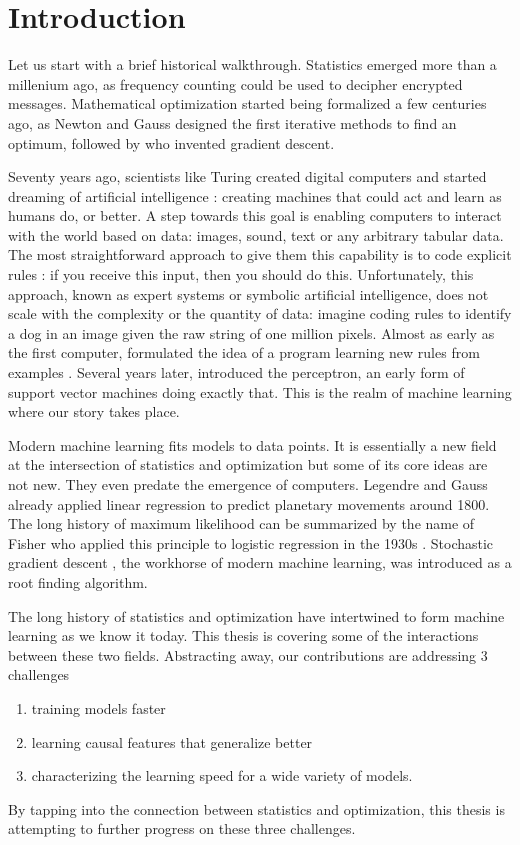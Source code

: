\setcounter{theorem}{0}

\chapter{Introduction}

Let us start with a brief historical walkthrough.
Statistics emerged more than a millenium ago, as frequency counting could be used to decipher encrypted messages.
Mathematical optimization started being formalized a few centuries ago, as
Newton and Gauss designed the first iterative methods to find an optimum, followed by \citet{cauchy1847methode}  who invented gradient descent.

Seventy years ago, scientists like Turing created  digital computers and started dreaming of artificial intelligence : creating machines that could act and learn as humans do, or better.
A step towards this goal is enabling computers to interact with the world based on data: images, sound, text or any arbitrary tabular data.
The most straightforward approach to give them this capability is to code explicit rules : if you receive this input, then you should do this.
Unfortunately, this approach, known as expert systems or symbolic artificial intelligence, does not scale with the complexity or the quantity of data:
imagine coding rules to identify a dog in an image given the raw string of one million pixels.
Almost as early as the first computer,  \citet{turing1950computing} formulated the idea of a program learning new rules from examples \citep{muggleton2014alan}.
Several years later, \citet{rosenblatt1957perceptron} introduced the perceptron, an early form of support vector machines doing exactly that.
This is the realm of machine learning where our story takes place.


Modern machine learning  fits models to data points.
It is essentially a new field at the intersection of statistics and optimization
but some of its core ideas are not new.
They even predate the emergence of computers.
Legendre and Gauss already applied linear regression to predict planetary movements around 1800.
The long history of maximum likelihood can be summarized by the name of Fisher who applied this principle to logistic regression in the 1930s \citep{stigler2007epic}.
Stochastic gradient descent \citep{robbins1951stochastic}, the workhorse of modern machine learning, was introduced as a root finding algorithm.

The long history of statistics and optimization have intertwined to form machine learning as we know it today.
This thesis is covering some of the interactions between these two fields.
Abstracting away, our contributions are  addressing 3 challenges
\begin{enumerate}
	\item training models faster
	\item learning causal features that generalize better
	\item characterizing the learning speed for a wide variety of models.
\end{enumerate}
By tapping into the connection between statistics and optimization, this thesis is attempting to further progress on these three challenges.

